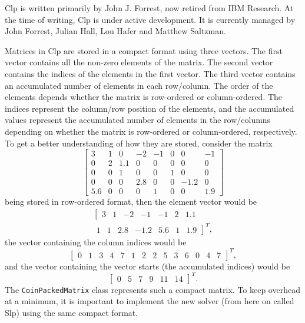 Clp is written primarily by John J. Forrest, now retired from IBM Research. At
the time of writing, Clp is under active development. It is currently
managed by John Forrest, Julian Hall, Lou Hafer and Matthew Saltzman.
\cite{clppage}

Matrices in Clp are stored in a compact format using three vectors.
The first vector contains all the non-zero elements of the matrix.
The second vector contains the indices of the elements in the first vector.
The third vector contains an accumulated number of elements in each row/column.
The order of the elements depends whether the matrix is row-ordered or
column-ordered.
The indices represent the column/row position of the elements, and the
accumulated values represent the accumulated number of elements in the
row/columns depending on whether the matrix is row-ordered or column-ordered,
respectively.
To get a better understanding of how they are stored, consider the matrix
\[
\left[
\begin{array}{rrrrrrrr}
    3 & 1 & 0   & -2  & -1 & 0 & 0    & -1 \\
    0 & 2 & 1.1 & 0   & 0  & 0 & 0    & 0  \\
    0 & 0 & 1   & 0   & 0  & 1 & 0    & 0  \\
    0 & 0 & 0   & 2.8 & 0  & 0 & -1.2 & 0  \\
  5.6 & 0 & 0   & 0   & 1  & 0 & 0    & 1.9  

\end{array}
\right]
\]
being stored in row-ordered format, then the element vector would be
\[
\begin{array}{l}
\left[
\begin{array}{rrrrrrr}
    3 & 1 & -2 & -1 & -1 & 2 & 1.1
\end{array}\right. \\
\left.\begin{array}{rrrrrrr}
    1 & 1 & 2.8 & -1.2 & 5.6 & 1 & 1.9
\end{array}
\right]^T,
\end{array}
\]
the vector containing the column indices would be
\[
\left[
\begin{array}{rrrrrrrrrrrrrr}
    0 & 1 & 3 & 4 & 7 & 1 & 2 & 2 & 5 & 3 & 6 & 0 & 4 & 7
\end{array}
\right]^T,
\]
and the vector containing the vector starts (the accumulated indices) would be
\[
\left[
\begin{array}{rrrrrr}
    0 & 5 & 7 & 9 & 11 & 14
\end{array}
\right]^T.
\]
The \texttt{CoinPackedMatrix} class represents such a compact matrix.
To keep overhead at a minimum, it is important to implement the new solver
(from here on called Slp) using the same compact format.

